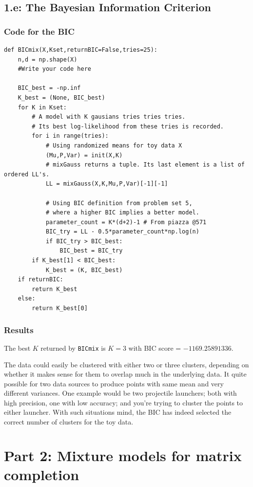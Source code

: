 \documentclass{article}
\begin{document}
\pagebreak
\subsection*{1.e:  The Bayesian Information Criterion} 
\subsubsection*{Code for the BIC}
\begin{lstlisting}
def BICmix(X,Kset,returnBIC=False,tries=25):
    n,d = np.shape(X)
    #Write your code here

    BIC_best = -np.inf
    K_best = (None, BIC_best)
    for K in Kset:
        # A model with K gausians tries tries tries.
        # Its best log-likelihood from these tries is recorded.
        for i in range(tries):
            # Using randomized means for toy data X
            (Mu,P,Var) = init(X,K)
            # mixGauss returns a tuple. Its last element is a list of ordered LL's. 
            LL = mixGauss(X,K,Mu,P,Var)[-1][-1]

            # Using BIC definition from problem set 5,
            # where a higher BIC implies a better model.
            parameter_count = K*(d+2)-1 # From piazza @571
            BIC_try = LL - 0.5*parameter_count*np.log(n)
            if BIC_try > BIC_best:
                BIC_best = BIC_try
        if K_best[1] < BIC_best:
            K_best = (K, BIC_best)
    if returnBIC:
        return K_best
    else:
        return K_best[0]
\end{lstlisting}
\subsubsection*{Results}

  The best $K$ returned by \texttt{BICmix} is $K = 3$  with BIC score = $-1169.25891336$.

 The data could easily be clustered with either two or three clusters, depending on whether it makes sense for them to overlap much in the underlying data. It quite possible for two data sources to produce points with same mean and very different variances. One example would be two projectile launchers; both with high precision, one with low accuracy; and you're trying to cluster the points to either launcher. With such situations mind, the BIC has indeed selected the correct number of clusters for the toy data. 
\section*{ Part 2: Mixture models for matrix completion}
\end{document}
